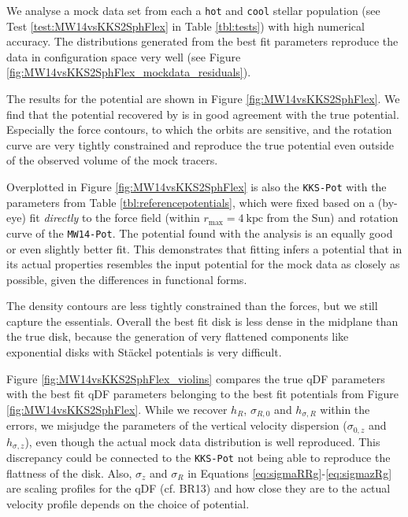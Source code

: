 We analyse a mock data set from each a \texttt{hot} and \texttt{cool} stellar population (see Test \ref{test:MW14vsKKS2SphFlex} in Table \ref{tbl:tests}) with high numerical accuracy. The distributions generated from the best fit parameters reproduce the data in configuration space very well (see Figure \ref{fig:MW14vsKKS2SphFlex_mockdata_residuals}).

The results for the potential are shown in Figure \ref{fig:MW14vsKKS2SphFlex}. We find that the potential recovered by \RM{} is in good agreement with the true potential. Especially the force contours, to which the orbits are sensitive, and the rotation curve are very tightly constrained and reproduce the true potential even outside of the observed volume of the mock tracers.

Overplotted in Figure \ref{fig:MW14vsKKS2SphFlex} is also the \texttt{KKS-Pot} with the parameters from Table \ref{tbl:referencepotentials}, which were fixed based on a (by-eye) fit \emph{directly} to the force field (within $r_\text{max}=4~\text{kpc}$ from the Sun) and rotation curve of the \texttt{MW14-Pot}. The potential found with the \RM{} analysis is an equally good or even slightly better fit. This demonstrates that \RM{} fitting infers a potential that in its actual properties resembles the input potential for the mock data as closely as possible, given the differences in functional forms.

The density contours are less tightly constrained than the forces, but we still capture the essentials. Overall the best fit disk is less dense in the midplane than the true disk, because the generation of very flattened components like exponential disks with St\"{a}ckel potentials is very difficult.

Figure \ref{fig:MW14vsKKS2SphFlex_violins} compares the true qDF parameters with the best fit qDF parameters belonging to the best fit potentials from Figure \ref{fig:MW14vsKKS2SphFlex}. While we recover $h_R$, $\sigma_{R,0}$ and $h_{\sigma,R}$ within the errors, we misjudge the parameters of the vertical velocity dispersion ($\sigma_{0,z}$ and $h_{\sigma,z}$), even though the actual mock data distribution is well reproduced. This discrepancy could be connected to the \texttt{KKS-Pot} not being able to reproduce the flattness of the disk. Also, $\sigma_z$ and $\sigma_R$ in Equations \ref{eq:sigmaRRg}-\ref{eq:sigmazRg} are scaling profiles for the qDF (cf. BR13) and how close they are to the actual velocity profile depends on the choice of potential.










